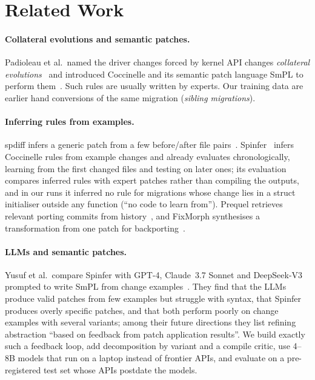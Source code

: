\section{Related Work}
\label{sec:related}

\paragraph{Collateral evolutions and semantic patches.} Padioleau et al.\ named the driver changes forced by kernel
API changes \emph{collateral evolutions}~\cite{padioleau2006understanding} and introduced Coccinelle and its
semantic patch language SmPL to perform them~\cite{padioleau2008documenting}. Such rules are usually written by
experts. Our training data are earlier hand conversions of the same migration (\emph{sibling migrations}).

\paragraph{Inferring rules from examples.} spdiff infers a generic patch from a few before/after file
pairs~\cite{andersen2008generic}. Spinfer~\cite{serrano2020spinfer} infers Coccinelle rules from example changes and
already evaluates chronologically, learning from the first changed files and testing on later ones; its evaluation
compares inferred rules with expert patches rather than compiling the outputs, and in our runs it inferred no rule
for migrations whose change lies in a struct initialiser outside any function (``no code to learn from'').
Prequel retrieves relevant porting commits from history~\cite{lawall2017prequel}, and FixMorph synthesises a
transformation from one patch for backporting~\cite{shariffdeen2021fixmorph}.

\paragraph{LLMs and semantic patches.} Yusuf et al.\ compare Spinfer with GPT-4, Claude~3.7 Sonnet and DeepSeek-V3
prompted to write SmPL from change examples~\cite{yusuf2025howfar}. They find that the LLMs produce valid patches
from few examples but struggle with syntax, that Spinfer produces overly specific patches, and that both perform
poorly on change examples with several variants; among their future directions they list refining abstraction
``based on feedback from patch application results''. We build exactly such a feedback loop, add decomposition by
variant and a compile critic, use 4--8B models that run on a laptop instead of frontier APIs, and evaluate on a
pre-registered test set whose APIs postdate the models.

